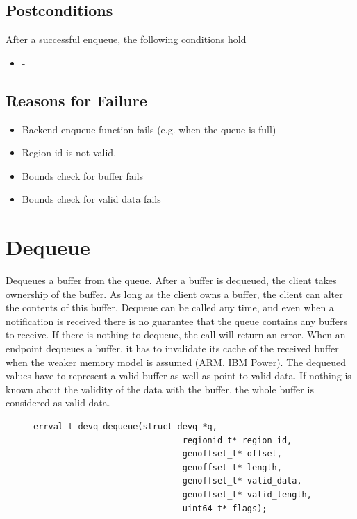\documentclass[a4paper,11pt,twoside]{report}
\begin{document}
	\subsection*{Postconditions}
	After a successful enqueue, the following conditions hold
	\begin{itemize}
		\item -
	\end{itemize}
	
	\subsection*{Reasons for Failure}
	\begin{itemize}
		\item Backend enqueue function fails (e.g. when the queue is full)
		\item Region id is not valid.
		\item Bounds check for buffer fails
		\item Bounds check for valid data fails
	\end{itemize}
	
	\section{Dequeue}
	Dequeues a buffer from the queue. After a buffer is dequeued, the client
	takes ownership of the buffer. As long as the client owns a buffer, the
	client can alter the contents of this buffer. Dequeue can be called any time,
	and even when a notification is received there is no guarantee that the queue contains any buffers
	to receive. If there is nothing to dequeue, the call will return an error. When an endpoint
	dequeues a buffer, it has to invalidate its cache of the received buffer when
	the weaker memory model is assumed (ARM, IBM Power). The dequeued values 
	have to represent a valid buffer as well as point to valid data. If nothing 
	is known about the validity of the data with the buffer, the whole buffer 
	is considered as valid data.

	\begin{figure}[h]
		\begin{lstlisting}[style=code]
		errval_t devq_dequeue(struct devq *q,
		                      regionid_t* region_id,
		                      genoffset_t* offset,
		                      genoffset_t* length,
		                      genoffset_t* valid_data,
		                      genoffset_t* valid_length,
		                      uint64_t* flags);
		\end{lstlisting}
		\label{lst:dequeue}
	\end{figure}
\end{document}
